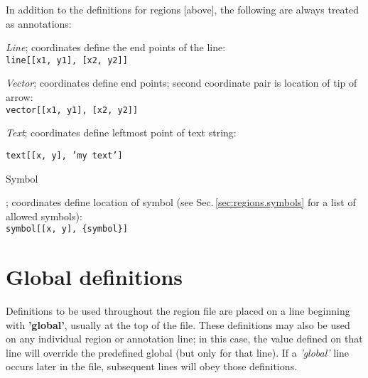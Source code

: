 In addition to the definitions for regions [above], the following are always treated as annotations:

\begin{itemize}

\item {\it Line}; coordinates define the end points of the line:\\

{\tt line[[x1, y1], [x2, y2]]}

\item {\it Vector}; coordinates define end points; second coordinate pair is location of tip of arrow:\\

{\tt vector[[x1, y1], [x2, y2]]}

\item {\it Text}; coordinates define leftmost point of text string:\\

{\tt text[[x, y], 'my text']

\item Symbol}; coordinates define location of symbol (see Sec.\,\ref{sec:regions.symbols} for a list of allowed symbols):\\

{\tt symbol[[x, y], \{symbol\}]}

\end{itemize}

\section{Global definitions}

Definitions to be used throughout the region file are placed on a line
beginning with {\bf 'global'}, usually at the top of the file.  These
definitions may also be used on any individual region or annotation
line; in this case, the value defined on that line will override the
predefined global (but only for that line).  If a {\it 'global'} line occurs
later in the file, subsequent lines will obey those definitions.

